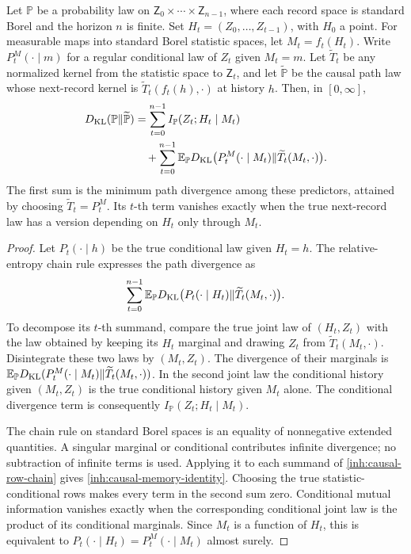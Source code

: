Let $\mathbb P$ be a probability law on
$\mathsf Z_0\times\cdots\times\mathsf Z_{n-1}$, where each record space
is standard Borel and the horizon $n$ is finite. Set $H_t=(Z_0,\ldots,Z_{t-1})$,
with $H_0$ a point. For measurable maps into standard Borel statistic
spaces, let $M_t=f_t(H_t)$. Write
$P_t^M(\cdot\mid m)$ for a regular conditional law of $Z_t$ given
$M_t=m$. Let $\widetilde T_t$ be any normalized kernel from the
statistic space to $\mathsf Z_t$, and let $\widetilde{\mathbb P}$ be
the causal path law whose next-record kernel is
$\widetilde T_t(f_t(h),\cdot)$ at history $h$. Then, in $[0,\infty]$,
\begin{equation}
 \begin{aligned}
 D_{\mathrm{KL}}(\mathbb P\Vert\widetilde{\mathbb P})
 &=\sum_{t=0}^{n-1}I_{\mathbb P}(Z_t;H_t\mid M_t)\\
 &\quad+\sum_{t=0}^{n-1}\mathbb E_{\mathbb P}
 D_{\mathrm{KL}}\bigl(P_t^M(\cdot\mid M_t)
          \Vert\widetilde T_t(M_t,\cdot)\bigr).
 \end{aligned}
 \label{inh:causal-memory-identity}
\end{equation}
The first sum is the minimum path divergence among these predictors,
attained by choosing $\widetilde T_t=P_t^M$. Its $t$-th term vanishes
exactly when the true next-record law has a version depending on $H_t$
only through $M_t$.
\begin{proof}
Let $P_t(\cdot\mid h)$ be the true conditional law given $H_t=h$.
The relative-entropy chain rule expresses the path divergence as
\begin{equation}
 \sum_{t=0}^{n-1}\mathbb E_{\mathbb P}
 D_{\mathrm{KL}}\bigl(P_t(\cdot\mid H_t)
          \Vert\widetilde T_t(M_t,\cdot)\bigr).
 \label{inh:causal-row-chain}
\end{equation}
To decompose its $t$-th summand, compare the true joint law of
$(H_t,Z_t)$ with the law obtained by keeping its $H_t$ marginal and
drawing $Z_t$ from $\widetilde T_t(M_t,\cdot)$. Disintegrate these
two laws by $(M_t,Z_t)$. The divergence of their marginals is
$\mathbb E_{\mathbb P}D_{\mathrm{KL}}(P_t^M(\cdot\mid M_t)
\Vert\widetilde T_t(M_t,\cdot))$.
In the second joint law the conditional history given $(M_t,Z_t)$
is the true conditional history given $M_t$ alone. The conditional
divergence term is consequently
$I_{\mathbb P}(Z_t;H_t\mid M_t)$.

The chain rule on standard Borel spaces is an equality of nonnegative
extended quantities. A singular marginal or conditional contributes
infinite divergence; no subtraction of infinite terms is used. Applying
it to each summand of \cref{inh:causal-row-chain} gives
\cref{inh:causal-memory-identity}. Choosing the true statistic-conditional
rows makes every term in the second sum zero. Conditional mutual
information vanishes exactly when the corresponding conditional joint
law is the product of its conditional marginals. Since $M_t$ is a
function of $H_t$, this is equivalent to
$P_t(\cdot\mid H_t)=P_t^M(\cdot\mid M_t)$ almost surely.
\end{proof}

